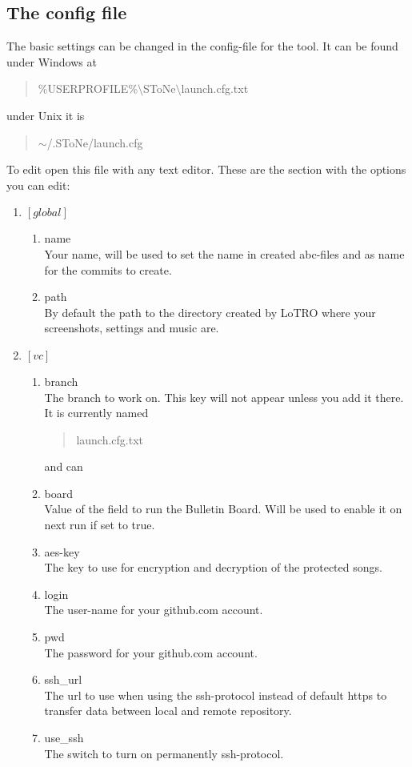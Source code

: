 \documentclass[10pt,a4paper,oneside]{article}
\begin{document}
\subsection{The config file}
\label{configFile}
The basic settings can be changed in the config-file for the tool. It can be found under Windows at \begin{quote}\%USERPROFILE\%$\setminus$SToNe$\setminus$launch.cfg.txt\end{quote} under Unix it is \begin{quote}$\sim$/.SToNe/launch.cfg\end{quote} To edit open this file with any text editor.
These are the section with the options you can edit:
\newpage
\begin{enumerate}
\item[] $\left[global\right]$
\begin{enumerate}
\item[] name \\ Your name, will be used to set the name in created abc-files and as name for the commits to create.
\item[] path \\ By default the path to the directory created by LoTRO where your screenshots, settings and music are.
\end{enumerate}

\item[] $\left[vc\right]$
\begin{enumerate}
\item[] branch \\ The branch to work on. This key will not appear unless you add it there. It is currently named \begin{quote}launch.cfg.txt\end{quote} and can
\item[] board \\ Value of the field to run the Bulletin Board. Will be used to enable it on next run if set to true.
\item[] aes-key \\ The key to use for encryption and decryption of the protected songs.
\item[] login \\ The user-name for your github.com account.
\item[] pwd \\ The password for your github.com account.
\item[] ssh\_url \\ The url to use when using the ssh-protocol instead of default https to transfer data between local and remote repository.
\item[] use\_ssh \\ The switch to turn on permanently ssh-protocol.
\end{enumerate}


\end{enumerate}
\end{document}
